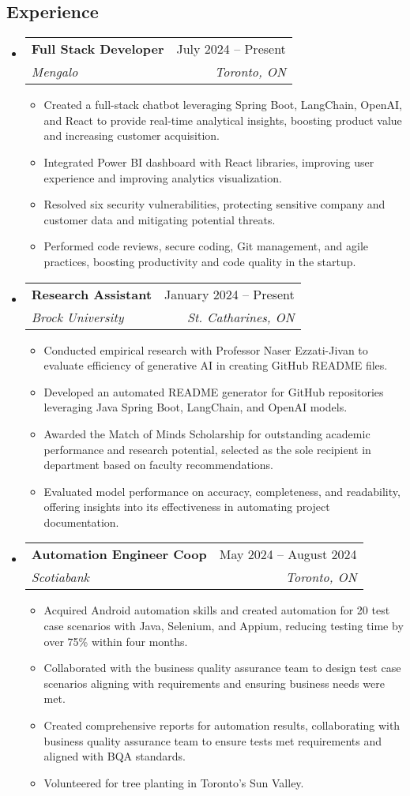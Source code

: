 \documentclass[letterpaper,11pt]{article}
\makeatletter
\newcommand{\resumeItem}[1]{
    \item\small{
            {#1 \vspace{-2pt}}
    }
}
\newcommand{\resumeSubheading}[4]{
    \vspace{-2pt}\item
    \begin{tabular*}{0.97\textwidth}[t]{l@{\extracolsep{\fill}}r}
    \textbf{#1} & #2 \\
    \textit{\small#3} & \textit{\small #4} \\
    \end{tabular*}\vspace{-7pt}
}
\newcommand{\resumeSubHeadingListStart}{\begin{itemize}[leftmargin=0.15in, label={}]}
\newcommand{\resumeSubHeadingListEnd}{\end{itemize}}
\newcommand{\resumeItemListStart}{\begin{itemize}}
\newcommand{\resumeItemListEnd}{\end{itemize}\vspace{-5pt}}
\makeatother
\begin{document}
\begin{center}

\section{Experience}

\resumeSubHeadingListStart
\resumeSubheading
{Full Stack Developer  }{July 2024 -- Present}
{Mengalo}{Toronto, ON}
\resumeItemListStart
\resumeItem{Created a full-stack chatbot leveraging Spring Boot, LangChain, OpenAI, and React to provide real-time analytical insights, boosting product value and increasing customer acquisition. }
\resumeItem{Integrated Power BI dashboard with React libraries, improving user experience and improving analytics visualization.}
\resumeItem{Resolved six security vulnerabilities, protecting sensitive company and customer data and mitigating potential threats.}
\resumeItem{Performed code reviews, secure coding, Git management, and agile practices, boosting productivity and code quality in the startup.}
\resumeItemListEnd
\resumeSubHeadingListEnd

\resumeSubHeadingListStart
\resumeSubheading
{Research Assistant}{January 2024 -- Present}
{Brock University}{St. Catharines, ON}
\resumeItemListStart
\resumeItem{Conducted empirical research with Professor Naser Ezzati-Jivan to evaluate efficiency of generative AI in creating GitHub README files.}
\resumeItem {Developed an automated README generator for GitHub repositories leveraging Java Spring Boot, LangChain, and OpenAI models.}
\resumeItem{Awarded the Match of Minds Scholarship for outstanding academic performance and research potential, selected as the sole recipient in department based on faculty recommendations.}
\resumeItem{Evaluated model performance on accuracy, completeness, and readability, offering insights into its effectiveness in automating project documentation.}
\resumeItemListEnd
\resumeSubHeadingListEnd

\resumeSubHeadingListStart
\resumeSubheading
{Automation Engineer Coop}{May 2024 -- August 2024}
{Scotiabank}{Toronto, ON}
\resumeItemListStart
\resumeItem{Acquired Android automation skills and created automation for 20 test case scenarios with Java, Selenium, and Appium, reducing testing time by over 75\% within four months.}
\resumeItem{Collaborated with the business quality assurance team to design test case scenarios aligning with requirements and ensuring business needs were met.}
\resumeItem{Created comprehensive reports for automation results, collaborating with business quality assurance team to ensure tests met requirements and aligned with BQA standards.}
\resumeItem{Volunteered for tree planting in Toronto's Sun Valley.}
\resumeItemListEnd
\resumeSubHeadingListEnd


\end{center}
\end{document}
